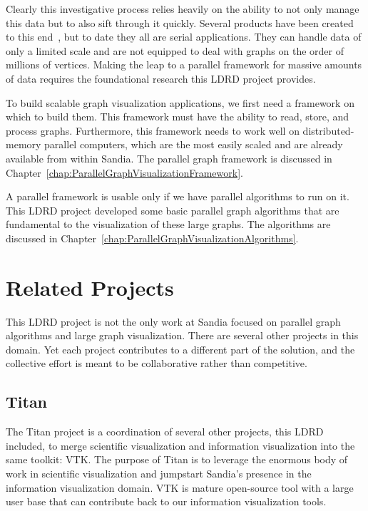 \documentclass[pdf,12pt,report,strict]{SANDreport}
\newcommand*{\lcite}[1]{~\cite{#1}}
\newcommand{\titan}{Titan\index{Titan}\xspace}
\begin{document}
Clearly this investigative process relies heavily on the ability to not
only manage this data but to also sift through it quickly.  Several
products have been created to this end\lcite{Hetzler98,Thomas99,Boyack01},
but to date they all are serial applications.  They can handle data of only
a limited scale and are not equipped to deal with graphs on the order of
millions of vertices.  Making the leap to a parallel framework for massive
amounts of data requires the foundational research this LDRD project
provides.

To build scalable graph visualization applications, we first need a
framework on which to build them.  This framework must have the ability to
read, store, and process graphs.  Furthermore, this framework needs to work
well on distributed-memory parallel computers, which are the most easily
scaled and  are already available from within Sandia.  The parallel graph
framework is discussed in
Chapter~\ref{chap:ParallelGraphVisualizationFramework}.

A parallel framework is usable only if we have parallel algorithms to run
on it.  This LDRD project developed some basic parallel graph algorithms
that are fundamental to the visualization of these large graphs.  The
algorithms are discussed in
Chapter~\ref{chap:ParallelGraphVisualizationAlgorithms}.

\section{Related Projects}
\label{sec:RelatedProjects}

This LDRD project is not the only work at Sandia focused on parallel graph
algorithms and large graph visualization.  There are several other projects
in this domain.  Yet each project contributes to a different part of the
solution, and the collective effort is meant to be collaborative rather
than competitive.

\subsection{\titan}
\label{sec:RelatedProjects:Titan}


The \titan project is a coordination of several other projects, this LDRD
included, to merge scientific visualization
and information visualization into the
same toolkit: VTK.  The purpose of \titan is to leverage the
enormous body of work in scientific visualization and jumpstart Sandia's
presence in the information visualization domain.  VTK is mature
open-source tool with a large user base that can contribute back to our
information visualization tools.
\end{document}
